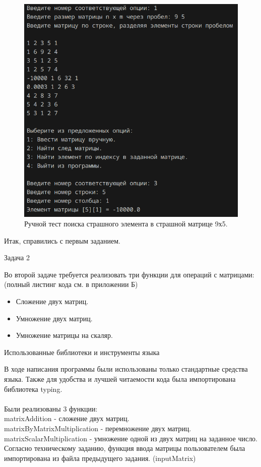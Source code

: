 \begin{figure}[H]
	\centering
	\includegraphics[width=0.5\linewidth]{tests-task3}
	\caption*{Ручной тест поиска страшного элемента в страшной матрице 9х5.}
	\label{fig:tests-task3}
\end{figure}
Итак, справились с первым заданием.\vspace{2cm}

\begin{large}
	Задача 2\\
\end{large}
Во второй задаче требуется реализовать три функции для операций с матрицами: (полный листинг кода см. в приложении Б)\\
\begin{itemize}
	\item Сложение двух матриц.
	\item Умножение двух матриц.
	\item Умножение матрицы на скаляр.\\
\end{itemize}

\begin{large}
	Использованные библиотеки и инструменты языка\\
\end{large}
В ходе написания программы были использованы только стандартные средства языка. Также для удобства и лучшей читаемости кода была импортирована библиотека typing.\\\\
Были реализованы 3 функции:\\
matrixAddition - сложение двух матриц.\\
matrixByMatrixMultiplication - перемножение двух матриц.\\
matrixScalarMultiplication - умножение одной из двух матриц на заданное число.\\
Согласно техническому заданию, функция ввода матрицы пользователем была импортирована из файла предыдущего задания. (inputMatrix)

